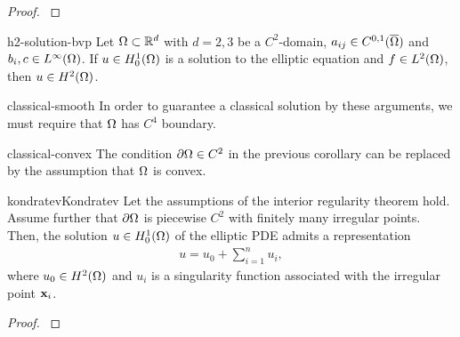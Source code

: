 \begin{proof}
  \cite[Theorem 8.13]{GilbargTrudinger98}
\end{proof}

\begin{Corollary}{h2-solution-bvp}
  Let $\Omega\subset \mathbb R^d$ with $d=2,3$ be a $C^2$-domain,
  $a_{ij} \in C^{0,1}(\overline{\Omega})$ and
  $b_i, c \in L^\infty(\Omega)$. If $u\in H^1_0(\Omega)$ is a solution
  to the elliptic equation and $f\in L^2(\Omega)$, then
  $u\in H^2(\Omega)$.
\end{Corollary}

\begin{Remark}{classical-smooth}
  In order to guarantee a classical solution by these arguments, we
  must require that $\Omega$ has $C^4$ boundary.
\end{Remark}

\begin{Remark}{classical-convex}
  The condition $\partial\Omega\in C^2$ in the previous corollary can be
  replaced by the assumption that $\Omega$ is convex.
\end{Remark}

\begin{Theorem*}{kondratev}{Kondratev}
  Let the assumptions of the interior regularity theorem
   hold. Assume further that $\partial\Omega$ is
  piecewise $C^2$ with finitely many irregular points. Then, the
  solution $u\in H^1_0(\Omega)$ of the elliptic PDE admits a
  representation
  \begin{gather}
    u = u_0 + \sum_{i=1}^n u_i,
  \end{gather}
  where $u_0\in H^2(\Omega)$ and $u_i$ is a singularity function
  associated with the irregular point $\mathbf x_i$.
\end{Theorem*}

\begin{proof}
  \cite{Kondratev67}
\end{proof}

